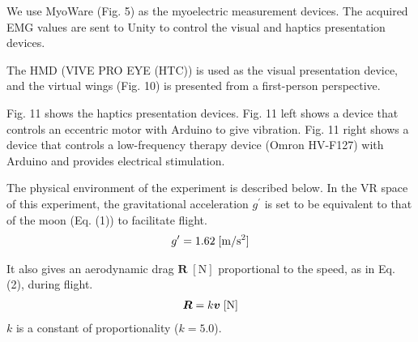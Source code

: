 \documentclass[letterpaper, 10 pt, conference]{ieeeconf}  %
\begin{document}
                We use MyoWare (Fig. 5) as the myoelectric measurement devices.  
                The acquired EMG values are sent to Unity to control the visual and haptics presentation devices.  

                The HMD (VIVE PRO EYE (HTC)) is used as the visual presentation device, and the virtual wings (Fig. 10) is presented from a first-person perspective.  

                
                Fig. 11 shows the haptics presentation devices.  
                Fig. 11 left shows a device that controls an eccentric motor with Arduino to give vibration.  
                Fig. 11 right shows a device that controls a low-frequency therapy device (Omron HV-F127) with Arduino and provides electrical stimulation.  

                The physical environment of the experiment is described below.  
                In the VR space of this experiment, the gravitational acceleration $g^{\prime}$ is set to be equivalent to that of the moon (Eq. (1)) to facilitate flight.
                \begin{eqnarray}
                        \equlabel{gravity}
                        g^{\prime}=1.62\;[\mathrm{m/s^{2}}]
                \end{eqnarray}

                It also gives an aerodynamic drag $\bm{R}\;[\mathrm{N}]$ proportional to the speed, as in Eq. (2), during flight.  
                \begin{eqnarray}
                        \equlabel{air_resistance}
                        \bm{R}=k\bm{v} \;[\mathrm{N}]
                \end{eqnarray}
                $k$ is a constant of proportionality ($k=5.0$).  
\end{document}
